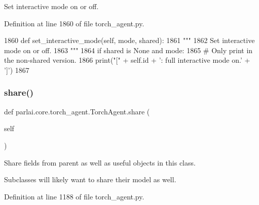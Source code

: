 \begin{DoxyVerb}Set interactive mode on or off.
\end{DoxyVerb}
 

Definition at line 1860 of file torch\+\_\+agent.\+py.


\begin{DoxyCode}
1860     \textcolor{keyword}{def }set\_interactive\_mode(self, mode, shared):
1861         \textcolor{stringliteral}{"""}
1862 \textcolor{stringliteral}{        Set interactive mode on or off.}
1863 \textcolor{stringliteral}{        """}
1864         \textcolor{keywordflow}{if} shared \textcolor{keywordflow}{is} \textcolor{keywordtype}{None} \textcolor{keywordflow}{and} mode:
1865             \textcolor{comment}{# Only print in the non-shared version.}
1866             print(\textcolor{stringliteral}{"["} + self.id + \textcolor{stringliteral}{': full interactive mode on.'} + \textcolor{stringliteral}{']'})
1867 
\end{DoxyCode}
\mbox{\label{classparlai_1_1core_1_1torch__agent_1_1TorchAgent_a373f0e276bf7c9d914a4e3363e9c2712}} 
\subsubsection{\texorpdfstring{share()}{share()}}
{\footnotesize\ttfamily def parlai.\+core.\+torch\+\_\+agent.\+Torch\+Agent.\+share (\begin{DoxyParamCaption}\item[{}]{self }\end{DoxyParamCaption})}

\begin{DoxyVerb}Share fields from parent as well as useful objects in this class.

Subclasses will likely want to share their model as well.
\end{DoxyVerb}
 

Definition at line 1188 of file torch\+\_\+agent.\+py.


